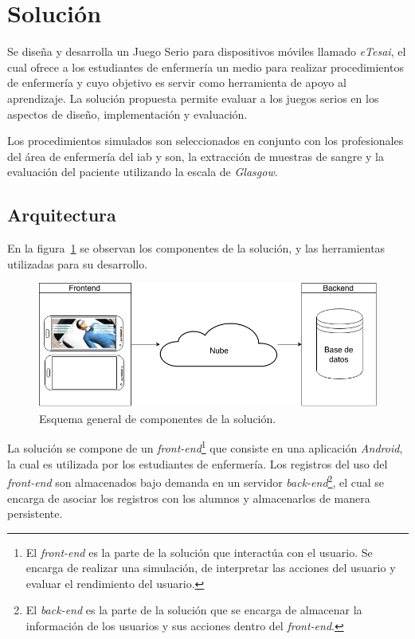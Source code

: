 
\section{Solución}


Se diseña y desarrolla un Juego Serio para dispositivos móviles llamado
\textit{eTesai}, el cual ofrece a los estudiantes de enfermería un medio para
realizar procedimientos de enfermería y cuyo objetivo es servir como herramienta
de apoyo al aprendizaje. La solución propuesta permite evaluar a los juegos
serios en los aspectos de diseño, implementación y evaluación.

Los procedimientos simulados son seleccionados en conjunto con los profesionales
del área de enfermería del \gls{iab} y son, la extracción de muestras de sangre
y la evaluación del paciente utilizando la escala de \textit{Glasgow}. 

\subsection{Arquitectura}

En la figura~\ref{fig:full_architecture} se observan los componentes de la
solución, y las herramientas utilizadas para su desarrollo.

\begin{figure}
\centering
\includegraphics[scale=0.29]{images/full.png}
\caption{Esquema general de componentes de la solución.}
\label{fig:full_architecture}
\end{figure}

La solución se compone de un \textit{front-end}\footnote{El \textit{front-end}
    es la parte de la solución que interactúa con el usuario. Se encarga de
    realizar una simulación, de interpretar las acciones del usuario y evaluar
    el rendimiento del usuario.} que consiste en una aplicación \textit{Android}, la cual
es utilizada por los estudiantes de enfermería. Los registros del uso del
\textit{front-end} son almacenados bajo demanda en un servidor
\textit{back-end}\footnote{El \textit{back-end} es la parte de la solución que
    se encarga de almacenar la información de los usuarios y sus acciones dentro
    del \textit{front-end}.}, el cual se encarga de asociar los registros con
los alumnos y almacenarlos de manera persistente.

